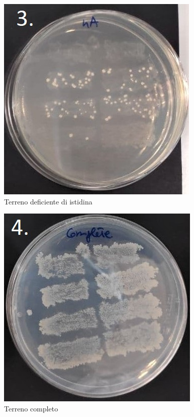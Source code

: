 \begin{multicols}{3}
	\begin{figure}[H]
		\centering
		\includegraphics[scale=0.4]{./Pics/GeniAmbiente/hA.jpg}
		\caption{Terreno deficiente di istidina}
		\label{fig4}
	\end{figure}

	\begin{figure}[H]
		\centering
		\includegraphics[scale=0.4]{./Pics/GeniAmbiente/Complete.jpg}
		\caption{Terreno completo}
		\label{fig5}
	\end{figure}


\end{multicols}
